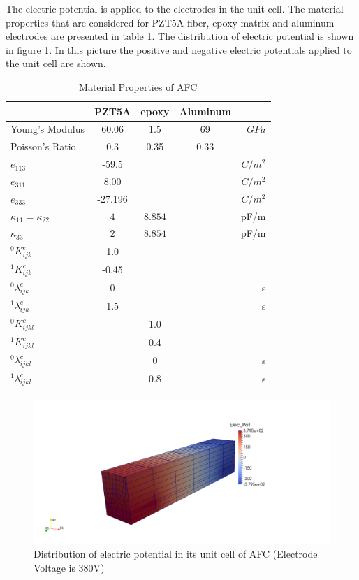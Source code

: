 The electric potential is applied to the electrodes in the unit cell.
The material properties that are considered for PZT5A fiber, epoxy matrix and aluminum electrodes are presented in table \ref{table:materila_properties_afc}.
The distribution of electric potential is shown in figure \ref{fig:electrip_potential_afc_pictur}.
In this picture the positive and negative electric potentials applied to the unit cell are shown.

\begin{table}
\caption{Material Properties of AFC}
\centering
\begin{tabular}{|l|c|c|c|r|}
\hline
               & PZT5A & epoxy & Aluminum & \\ \hline 
Young's Modulus&60.06 & 1.5     & 69       &$GPa$    \\ \hline
Poisson's Ratio&$0.3$ & 0.35    & 0.33 &\\ \hline 
$e_{113}$      &-59.5 &         &      &$C/m^2$\\ \hline
$e_{311}$      &8.00&         &      &$C/m^2$\\ \hline
$e_{333}$      &-27.196  &         &      &$C/m^2$\\ \hline
$\kappa_{11}=\kappa_{22}$ &  $ 4  $ & $8.854  $ & &  pF/m \\ \hline
$\kappa_{33}$ & $2  $              & $8.854  $ & &  pF/m \\ \hline
${}^{0}K_{ijk}^{e}$&1.0& & &  \\ \hline
${}^{1}K_{ijk}^{e}$&-0.45& & & \\ \hline
${}^{0}\lambda_{ijk}^{e}$&0& & & s \\ \hline
${}^{1}\lambda_{ijk}^{e}$&1.5& & & s \\ \hline 
${}^{0}K_{ijkl}^{c}$& &1.0 & &  \\ \hline 
${}^{1}K_{ijkl}^{c}$& &0.4 & & \\ \hline
${}^{0}\lambda_{ijkl}^{c}$& &0&  & s\\ \hline
${}^{1}\lambda_{ijkl}^{c}$& &0.8 & & s \\ \hline 
\end{tabular}
\label{table:materila_properties_afc} 
\end{table}

\begin{figure} 
\centering
\includegraphics[width=5.0in]{./chap_4_structural_analyses/afc_unit_cell/afc_electrip_potential_distribution.png}
\caption{Distribution of electric potential in its unit cell of AFC (Electrode Voltage is 380V)}
\label{fig:electrip_potential_afc_pictur}  
\end{figure}  


